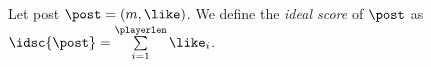 \begin{definition}
  Let post $\post = \left(m, \like\right)$. We define the \emph{ideal score} of
  $\post$ as $\idsc{\post} = \sum\limits_{i = 1}^\playerlen
  \like_i$.
\end{definition}
